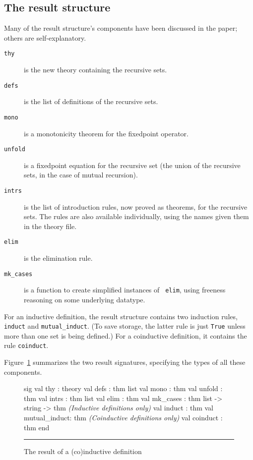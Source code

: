 \subsection{The result structure}
Many of the result structure's components have been discussed in the paper;
others are self-explanatory.
\begin{description}
\item[\tt thy] is the new theory containing the recursive sets.

\item[\tt defs] is the list of definitions of the recursive sets.

\item[\tt mono] is a monotonicity theorem for the fixedpoint operator.

\item[\tt unfold] is a fixedpoint equation for the recursive set (the union of
the recursive sets, in the case of mutual recursion).

\item[\tt intrs] is the list of introduction rules, now proved as theorems, for
the recursive sets.  The rules are also available individually, using the
names given them in the theory file. 

\item[\tt elim] is the elimination rule.

\item[\tt mk_cases] is a function to create simplified instances of {\tt
elim}, using freeness reasoning on some underlying datatype.
\end{description}

For an inductive definition, the result structure contains two induction
rules, \texttt{induct} and \verb|mutual_induct|.  (To save storage, the latter
rule is just \texttt{True} unless more than one set is being defined.)  For a
coinductive definition, it contains the rule \verb|coinduct|.

Figure~\ref{def-result-fig} summarizes the two result signatures,
specifying the types of all these components.

\begin{figure}
\begin{ttbox}
sig
val thy          : theory
val defs         : thm list
val mono         : thm
val unfold       : thm
val intrs        : thm list
val elim         : thm
val mk_cases     : thm list -> string -> thm
{\it(Inductive definitions only)} 
val induct       : thm
val mutual_induct: thm
{\it(Coinductive definitions only)}
val coinduct    : thm
end
\end{ttbox}
\hrule
\caption{The result of a (co)inductive definition} \label{def-result-fig}
\end{figure}

